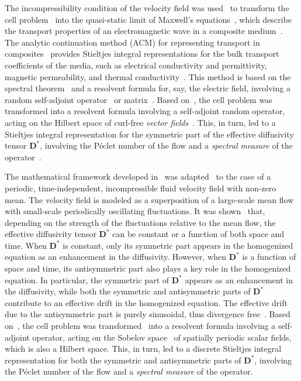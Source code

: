 \documentclass[leqno,onefignum,onetabnum]{siamltex1213}
\newcommand{\Db}{\mathbf{D}}
\begin{document}
The incompressibility condition of the velocity field was
used~\cite{Avellaneda:PRL-753,Avellaneda:CMP-339} to transform the
cell problem~\cite{McLaughlin:SIAM_JAM:780} into the quasi-static
limit of Maxwell's equations~\cite{Jackson-1999,Golden:CMP-473}, which
describe the transport properties of an electromagnetic wave in a
composite medium~\cite{MILTON:2002:TC}. The analytic continuation
method (ACM) for representing transport in
composites~\cite{Golden:CMP-473} provides Stieltjes integral
representations for the bulk transport coefficients of the media, such
as electrical conductivity and permittivity, magnetic permeability,
and thermal conductivity~\cite{MILTON:2002:TC}. This 
method is based on the spectral theorem~\cite{Stone:64,Reed-1980} and
a resolvent formula for, say, the electric field, involving a random
self-adjoint operator~\cite{Golden:CMP-473,Murphy:JMP:063506} or
matrix~\cite{Murphy:CMS:Submitted}. Based on~\cite{Golden:CMP-473},
the cell problem was transformed into a resolvent formula involving a
self-adjoint random operator, acting on the Hilbert space of
curl-free \emph{vector
  fields}~\cite{Avellaneda:PRL-753,Avellaneda:CMP-339}. This, in turn,  
led to a Stieltjes integral representation for the symmetric part of
the effective diffusivity tensor $\Db^*$, involving the P\'{e}clet
number of the flow and a \emph{spectral measure} of the
operator~\cite{Avellaneda:PRL-753,Avellaneda:CMP-339}.



The mathematical framework developed in~\cite{McLaughlin:SIAM_JAM:780}
was adapted~\cite{Pavliotis:PHD_Thesis} to the case of a periodic,
time-independent, incompressible fluid velocity field with non-zero
mean. The velocity field is modeled as a superposition of a
large-scale mean flow with small-scale periodically oscillating 
fluctuations. It was shown~\cite{Pavliotis:PHD_Thesis} that, depending
on the strength of the fluctuations relative to the mean flow, the
effective diffusivity tensor $\Db^*$ can be constant or a function of
both space and time. When $\Db^*$ is constant, only its symmetric part
appears in the homogenized equation as an enhancement in the
diffusivity. However, when $\Db^*$ is a function of space and time,
its antisymmetric part also plays a key role in the homogenized
equation. In particular, the symmetric part of $\Db^*$ appears as an
enhancement in the diffusivity, while both the symmetric and
antisymmetric parts of $\Db^*$ contribute to an effective drift in the
homogenized equation. The effective drift due to the antisymmetric
part is purely sinusoidal, thus divergence
free~\cite{Pavliotis:PHD_Thesis}. Based
on~\cite{Bhattacharya:AAP:1999:951}, the cell problem was
transformed~\cite{Pavliotis:PHD_Thesis} into a resolvent formula
involving a self-adjoint operator, acting on the Sobelov
space~\cite{McOwen:2003:PDE,Folland:95} of spatially periodic scalar
fields, which is also a Hilbert space. This, in turn, led to a
discrete Stieltjes integral representation for both the symmetric and
antisymmetric parts of $\Db^*$, involving the P\'{e}clet number of the
flow and a \emph{spectral measure} of the operator.   
\end{document}
